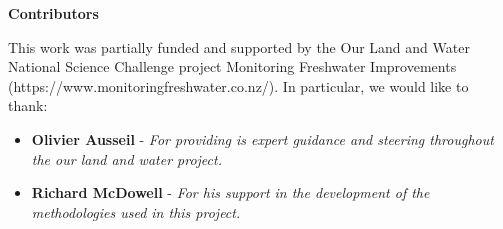 
\color{ksldarkblue} \LARGE \textbf{Contributors}
\color{black} \normalsize

This work was partially funded and supported by the Our Land and Water National Science Challenge project Monitoring Freshwater Improvements (https://www.monitoringfreshwater.co.nz/). In particular, we would like to thank:
\begin{itemize}
    \item \textbf{Olivier Ausseil} - \textit{For providing is expert guidance and steering throughout the our land and water project.}
    \item \textbf{Richard McDowell} - \textit{For his support in the development of the methodologies used in this project.}
\end{itemize}
